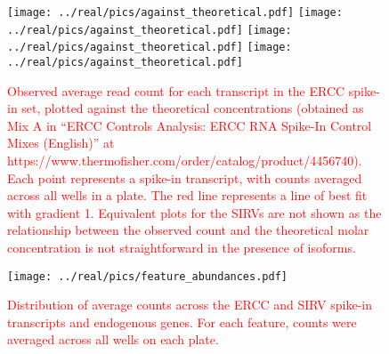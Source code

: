 \documentclass{article}
\newcommand\revised[1]{\textcolor{red}{#1}}
\begin{document}

\begin{figure}[btp]
    \begin{center}
       \texttt{[image: ../real/pics/against\_theoretical.pdf]}
       \texttt{[image: ../real/pics/against\_theoretical.pdf]}
       \texttt{[image: ../real/pics/against\_theoretical.pdf]}
       \texttt{[image: ../real/pics/against\_theoretical.pdf]}
       \caption{\revised{Observed average read count for each transcript in the ERCC spike-in set, plotted against the theoretical concentrations (obtained as Mix A in ``ERCC Controls Analysis: ERCC RNA Spike-In Control Mixes (English)'' at https://www.thermofisher.com/order/catalog/product/4456740).
        Each point represents a spike-in transcript, with counts averaged across all wells in a plate.
        The red line represents a line of best fit with gradient 1.
        Equivalent plots for the SIRVs are not shown as the relationship between the observed count and the theoretical molar concentration is not straightforward in the presence of isoforms.
       }}
    \end{center}
\end{figure}

\begin{figure}[btp]
    \begin{center}
        \texttt{[image: ../real/pics/feature\_abundances.pdf]}
    \end{center}
    \caption{\revised{Distribution of average counts across the ERCC and SIRV spike-in transcripts and endogenous genes.
    For each feature, counts were averaged across all wells on each plate.}}
\end{figure}
\end{document}
